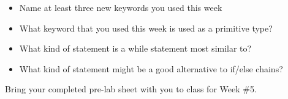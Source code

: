 \begin{exer}

\begin{itemize}
  
\item Name at least three new keywords you used this week

  \evalline
  
\item What keyword that you used this week is used as a primitive type?

  \evalline
  
\item What kind of statement is a while statement most similar to?

  \evalline
  
\item What kind of statement might be a good alternative to if/else chains?

  \evalline
  
  
\end{itemize}

\end{exer}

Bring your completed pre-lab sheet with you to class for Week \#5. 

